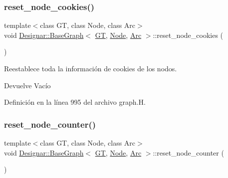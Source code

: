 \subsubsection{\texorpdfstring{reset\+\_\+node\+\_\+cookies()}{reset\_node\_cookies()}}
{\footnotesize\ttfamily template$<$class GT, class Node, class Arc$>$ \\
void \hyperlink{class_designar_1_1_base_graph}{Designar\+::\+Base\+Graph}$<$ \hyperlink{demo-buildgraph_8_c_a3001c40d2c31ca87ed96cd7d1334a55e}{GT}, \hyperlink{namespace_designar_a5af326c65aa2bd26b26c410f2030d09e}{Node}, \hyperlink{namespace_designar_a3f55fb5513d62ff47cbc8f72b8e95d6f}{Arc} $>$\+::reset\+\_\+node\+\_\+cookies (\begin{DoxyParamCaption}{ }\end{DoxyParamCaption})\hspace{0.3cm}{\ttfamily [inline]}}



Reestablece toda la información de cookies de los nodos. 

\begin{DoxyReturn}{Devuelve}
Vacío 
\end{DoxyReturn}


Definición en la línea 995 del archivo graph.\+H.

\mbox{\label{class_designar_1_1_base_graph_a53603f64b51b470cc6b8c8d6d2b643a4}} 
\subsubsection{\texorpdfstring{reset\+\_\+node\+\_\+counter()}{reset\_node\_counter()}}
{\footnotesize\ttfamily template$<$class GT, class Node, class Arc$>$ \\
void \hyperlink{class_designar_1_1_base_graph}{Designar\+::\+Base\+Graph}$<$ \hyperlink{demo-buildgraph_8_c_a3001c40d2c31ca87ed96cd7d1334a55e}{GT}, \hyperlink{namespace_designar_a5af326c65aa2bd26b26c410f2030d09e}{Node}, \hyperlink{namespace_designar_a3f55fb5513d62ff47cbc8f72b8e95d6f}{Arc} $>$\+::reset\+\_\+node\+\_\+counter (\begin{DoxyParamCaption}{ }\end{DoxyParamCaption})\hspace{0.3cm}{\ttfamily [inline]}}




